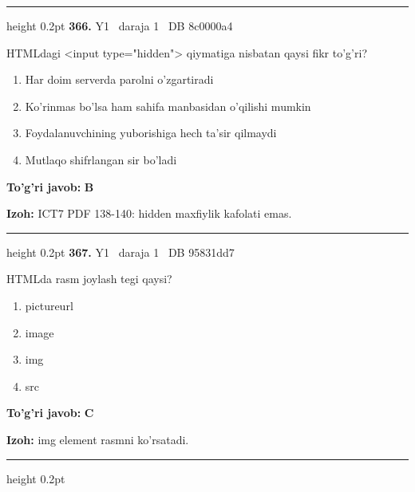 \documentclass[10pt,a4paper,oneside]{article}
\begin{document}
\vspace{2mm}\hrule height 0.2pt \vspace{4mm}
\hypertarget{q366}{\textbf{\color{ink}366.}}  {\color{muted}\scriptsize Y1 \textbullet\ daraja 1 \textbullet\ DB 8c0000a4}
\par
HTMLdagi \textless{}input type="hidden"\textgreater{} qiymatiga nisbatan qaysi fikr to'g'ri?
\begin{enumerate}[label=\Alph*),leftmargin=9mm]
\item Har doim serverda parolni o'zgartiradi
\item Ko'rinmas bo'lsa ham sahifa manbasidan o'qilishi mumkin
\item Foydalanuvchining yuborishiga hech ta'sir qilmaydi
\item Mutlaqo shifrlangan sir bo'ladi
\end{enumerate}
\begin{tcolorbox}[enhanced,breakable,colback=teal!4,colframe=teal!45!black,boxrule=0.45pt,arc=1.2mm,left=2.8mm,right=2.8mm,top=2mm,bottom=2mm,before skip=2mm,after skip=2mm]
\textbf{\color{teal}To'g'ri javob:} \textbf{B}
\par\smallskip
\textbf{Izoh:} ICT7 PDF 138-140: hidden maxfiylik kafolati emas.
\end{tcolorbox}
\vspace{2mm}\hrule height 0.2pt \vspace{4mm}
\hypertarget{q367}{\textbf{\color{ink}367.}}  {\color{muted}\scriptsize Y1 \textbullet\ daraja 1 \textbullet\ DB 95831dd7}
\par
HTMLda rasm joylash tegi qaysi?
\begin{enumerate}[label=\Alph*),leftmargin=9mm]
\item pictureurl
\item image
\item img
\item src
\end{enumerate}
\begin{tcolorbox}[enhanced,breakable,colback=teal!4,colframe=teal!45!black,boxrule=0.45pt,arc=1.2mm,left=2.8mm,right=2.8mm,top=2mm,bottom=2mm,before skip=2mm,after skip=2mm]
\textbf{\color{teal}To'g'ri javob:} \textbf{C}
\par\smallskip
\textbf{Izoh:} img element rasmni ko'rsatadi.
\end{tcolorbox}
\vspace{2mm}\hrule height 0.2pt \vspace{4mm}
\end{document}
